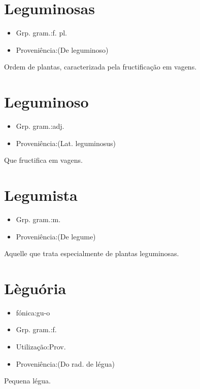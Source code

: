 \section{Leguminosas}
\begin{itemize}
\item {Grp. gram.:f. pl.}
\end{itemize}
\begin{itemize}
\item {Proveniência:(De \textunderscore leguminoso\textunderscore )}
\end{itemize}
Ordem de plantas, caracterizada pela fructificação em vagens.
\section{Leguminoso}
\begin{itemize}
\item {Grp. gram.:adj.}
\end{itemize}
\begin{itemize}
\item {Proveniência:(Lat. \textunderscore leguminosus\textunderscore )}
\end{itemize}
Que fructifica em vagens.
\section{Legumista}
\begin{itemize}
\item {Grp. gram.:m.}
\end{itemize}
\begin{itemize}
\item {Proveniência:(De \textunderscore legume\textunderscore )}
\end{itemize}
Aquelle que trata especialmente de plantas leguminosas.
\section{Lèguória}
\begin{itemize}
\item {fónica:gu-o}
\end{itemize}
\begin{itemize}
\item {Grp. gram.:f.}
\end{itemize}
\begin{itemize}
\item {Utilização:Prov.}
\end{itemize}
\begin{itemize}
\item {Proveniência:(Do rad. de \textunderscore légua\textunderscore )}
\end{itemize}
Pequena légua.
